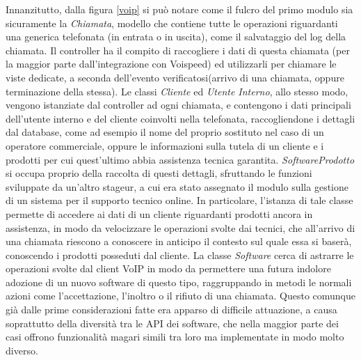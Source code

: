 Innanzitutto, dalla figura \ref{voip} si pu\`o notare come il fulcro del primo modulo sia sicuramente la \textit{Chiamata}, modello che contiene tutte le 
operazioni riguardanti una generica telefonata (in entrata o in uscita), come il salvataggio del log della chiamata.
Il controller ha il compito di raccogliere i dati di questa chiamata (per la maggior parte dall'integrazione con Voispeed) ed 
utilizzarli per chiamare le viste dedicate, a seconda dell'evento verificatosi(arrivo di una chiamata, oppure terminazione della stessa).
Le classi \textit{Cliente} ed \textit{Utente Interno}, allo stesso modo, vengono istanziate dal controller ad ogni chiamata, e 
contengono i dati principali dell'utente interno e del cliente coinvolti nella telefonata, raccogliendone i dettagli dal database, come 
ad esempio il nome del proprio sostituto nel caso di un operatore commerciale, oppure le informazioni sulla tutela di un cliente 
e i prodotti per cui quest'ultimo abbia assistenza tecnica garantita.
\textit{SoftwareProdotto} si occupa proprio della raccolta di questi dettagli, sfruttando le funzioni sviluppate da un'altro stageur, 
a cui era stato assegnato il modulo sulla gestione di un sistema per il supporto tecnico online.
In particolare, l'istanza di tale classe permette di accedere ai dati di un cliente riguardanti 
prodotti ancora in assistenza, in modo da velocizzare le operazioni svolte dai tecnici, che all'arrivo di una
chiamata riescono a conoscere in anticipo il contesto sul quale essa si baser\`a, conoscendo i prodotti posseduti dal cliente.
La classe \textit{Software} cerca di astrarre le operazioni svolte dal client VoIP in modo da permettere una 
futura indolore adozione di un nuovo software di questo tipo, raggruppando in metodi le normali azioni come l'accettazione, 
l'inoltro o il rifiuto di una chiamata. Questo comunque gi\`a dalle prime considerazioni fatte era apparso di difficile attuazione,
 a causa soprattutto della diversit\`a tra le API dei software, che nella maggior parte dei casi offrono funzionalit\`a magari 
simili tra loro ma implementate in modo molto diverso.

